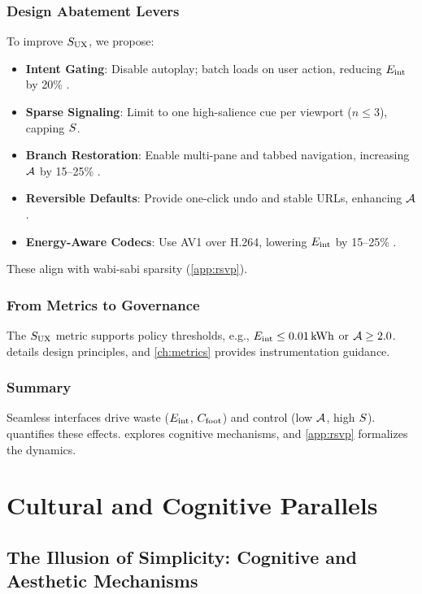 \section{Design Abatement Levers}
\label{sec:abatement}
To improve \(S_{\mathrm{UX}}\), we propose:
\begin{itemize}
  \item \textbf{Intent Gating}: Disable autoplay; batch loads on user action, reducing \(E_{\mathrm{int}}\) by 20\% \citep{extentia2024}.
  \item \textbf{Sparse Signaling}: Limit to one high-salience cue per viewport (\(n \leq 3\)), capping \(S\).
  \item \textbf{Branch Restoration}: Enable multi-pane and tabbed navigation, increasing \(\mathcal{A}\) by 15--25\% \citep{doctorow2022}.
  \item \textbf{Reversible Defaults}: Provide one-click undo and stable URLs, enhancing \(\mathcal{A}\).
  \item \textbf{Energy-Aware Codecs}: Use AV1 over H.264, lowering \(E_{\mathrm{int}}\) by 15--25\% \citep{extentia2024}.
\end{itemize}
These align with wabi-sabi sparsity (\cref{app:rsvp}).

\section{From Metrics to Governance}
\label{sec:governance-preview}
The \(S_{\mathrm{UX}}\) metric supports policy thresholds, e.g., \(\Eint \leq \SI{0.01}{\kWh}\) or \(\mathcal{A} \geq 2.0\).  details design principles, and \cref{ch:metrics} provides instrumentation guidance.

\section{Summary}
Seamless interfaces drive waste (\(E_{\mathrm{int}}\), \(C_{\mathrm{foot}}\)) and control (low \(\mathcal{A}\), high \(S\)).  quantifies these effects.  explores cognitive mechanisms, and \cref{app:rsvp} formalizes the dynamics.

\part{Cultural and Cognitive Parallels}

\chapter{The Illusion of Simplicity: Cognitive and Aesthetic Mechanisms}
\label{ch:illusion}

